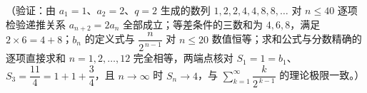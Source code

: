 \begin{answer}
（验证：由 \(a_{1}=1\)、\(a_{2}=2\)、\(q=2\) 生成的数列 \(1,2,2,4,4,8,8,\dots\) 对 \(n\leqslant40\) 逐项检验递推关系 \(a_{n+2}=2a_{n}\) 全部成立；等差条件的三数和为 \(4,6,8\)，满足 \(2\times6=4+8\)；\(b_{n}\) 的定义式与 \(\dfrac{n}{2^{\,n-1}}\) 对 \(n\leqslant20\) 数值恒等；求和公式与分数精确的逐项直接求和 \(n=1,2,\dots,12\) 完全相等，两端点核对 \(S_{1}=1=b_{1}\)、\(S_{3}=\dfrac{11}{4}=1+1+\dfrac{3}{4}\)，且 \(n\to\infty\) 时 \(S_{n}\to4\)，与 \(\sum\limits_{k=1}^{\infty}\dfrac{k}{2^{\,k-1}}\) 的理论极限一致。）



\end{answer}
